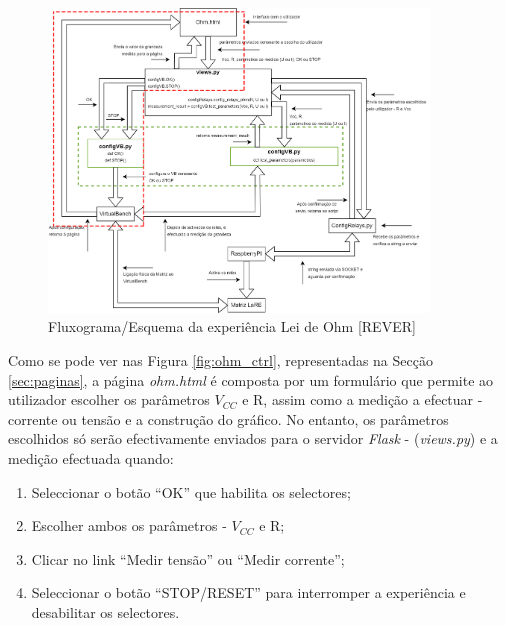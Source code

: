 \begin{figure}[hbtp]
	\centering
	\includegraphics[width=0.9\textwidth]{figures/ohm_diagrama_ALT.png}
	\caption{Fluxograma/Esquema da experiência Lei de Ohm [REVER]}
	\label{fig:fluxohm}
\end{figure}




Como se pode ver nas Figura \ref{fig:ohm_ctrl}, representadas na Secção \ref{sec:paginas}, a página \textit{ohm.html} é composta por um formulário que permite ao utilizador escolher os parâmetros $V_{CC}$ e R, assim como a medição a efectuar - corrente ou tensão e a construção do gráfico. No entanto, os parâmetros escolhidos só serão efectivamente enviados para o servidor \textit{Flask} - (\textit{views.py}) e a medição efectuada quando:
\begin{enumerate}
	\item Seleccionar o botão ``OK'' que habilita os selectores;
	\item Escolher ambos os parâmetros - $V_{CC}$ e R;
	\item Clicar no link ``Medir tensão'' ou ``Medir corrente'';
	\item Seleccionar o botão ``STOP/RESET'' para interromper a experiência e desabilitar os selectores.
\end{enumerate}

